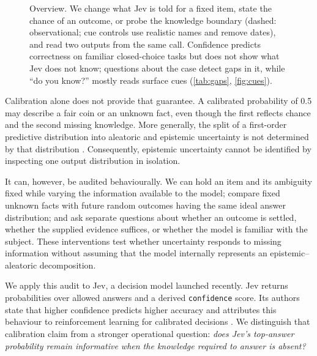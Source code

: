 \documentclass[10pt,twocolumn]{article}
\begin{document}
\begin{figure}[t]
\caption{Overview. We change what Jev is told for a fixed item, state the
chance of an outcome, or probe the knowledge boundary (dashed:
observational; cue controls use realistic names and remove dates), and read
two outputs from the same call. Confidence predicts correctness on familiar
closed-choice tasks but does not show what Jev does not know; questions about
the case detect gaps in it, while ``do you know?'' mostly reads surface cues
(\cref{tab:gaps}, \cref{fig:cues}).}
\label{fig:overview}
\end{figure}

Calibration alone does not provide that guarantee. A calibrated probability
of 0.5 may describe a fair coin or an unknown fact, even though the first
reflects chance and the second missing knowledge. More generally, the split
of a first-order predictive distribution into aleatoric and epistemic
uncertainty is not determined by that distribution
\citep{bengs2022pitfalls,wimmer2023quantifying,ahdritz2025provable}.
Consequently, epistemic uncertainty cannot be identified by inspecting one
output distribution in isolation.

It can, however, be audited behaviourally. We can hold an item and its
ambiguity fixed while varying the information available to the model; compare
fixed unknown facts with future random outcomes having the same ideal answer
distribution; and ask separate questions about whether an outcome is settled,
whether the supplied evidence suffices, or whether the model is familiar with
the subject. These interventions test whether uncertainty responds to missing
information without assuming that the model internally represents an
epistemic--aleatoric decomposition.

We apply this audit to Jev, a decision model launched recently. Jev returns probabilities over allowed answers and a derived
\texttt{confidence} score. Its authors state that higher confidence predicts
higher accuracy and attributes this behaviour to reinforcement learning for
calibrated decisions
\citep{typesafe2026launch,typesafe2026confidence}. We distinguish that
calibration claim from a stronger operational question: \emph{does Jev's
top-answer probability remain informative when the knowledge required to
answer is absent?}
\end{document}
